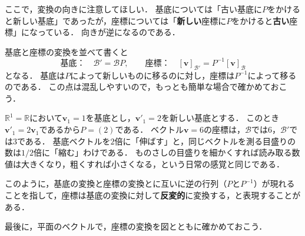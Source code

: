 ここで，変換の向きに注意してほしい．
基底については「古い基底に$P$をかけると新しい基底」であったが，座標については「\textbf{新しい}座標に$P$をかけると\textbf{古い}座標」になっている．
向きが逆になるのである．

\begin{remark}[基底と座標の変換の向き]
  基底と座標の変換を並べて書くと
  \[
    \text{基底：} \quad \mathcal{B}' = \mathcal{B}P,
    \qquad
    \text{座標：} \quad [\bm{v}]_{\mathcal{B}'} = P^{-1} [\bm{v}]_{\mathcal{B}}
  \]
  となる．
  基底は$P$によって新しいものに移るのに対し，座標は$P^{-1}$によって移るのである．
  この点は混乱しやすいので，もっとも簡単な場合で確かめておこう．

  $\mathbb{R}^1=\mathbb{R}$において$\bm{v}_1 = 1$を基底とし，$\bm{v}'_1 = 2$を新しい基底とする．
  このとき$\bm{v}'_1 = 2\bm{v}_1$であるから$P = (2)$である．
  ベクトル$\bm{v} = 6$の座標は，$\mathcal{B}$では$6$，$\mathcal{B}'$では$3$である．
  基底ベクトルを$2$倍に「伸ばす」と，同じベクトルを測る目盛りの数は$1/2$倍に「縮む」わけである．
  ものさしの目盛りを細かくすれば読み取る数値は大きくなり，粗くすれば小さくなる，という日常の感覚と同じである．

  このように，基底の変換と座標の変換とに互いに逆の行列（$P$と$P^{-1}$）が現れることを指して，座標は基底の変換に対して\textbf{反変的}に変換する，と表現することがある．
\end{remark}

最後に，平面のベクトルで，座標の変換を図とともに確かめておこう．

